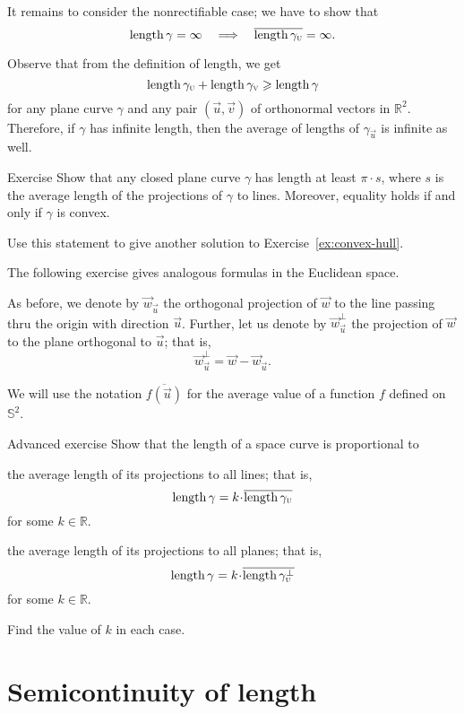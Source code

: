 It remains to consider the nonrectifiable case;
we have to show that 
\[\mathop{\rm length}\nolimits\gamma=\infty
\quad\Longrightarrow\quad
\overline{\mathop{\rm length}\nolimits\gamma_{\text{\sc{u}}}}=\infty.
\]

Observe that from the definition of length, we get
\[\mathop{\rm length}\nolimits\gamma_{\text{\sc{u}}}+\mathop{\rm length}\nolimits\gamma_{\text{\sc{v}}}\geqslant \mathop{\rm length}\nolimits\gamma\]
for any plane curve $\gamma$ and any pair $(\vec u , \vec v )$ of orthonormal vectors in $\mathbb{R}^2$.
Therefore, if $\gamma$ has infinite length, then the average of lengths of $\gamma_{\vec u}$ is infinite as well.
\qeds

\begin{thm}{Exercise}\label{ex:convex-croftons}
Show that any closed plane curve $\gamma$ has length at least $\pi\cdot s$, where $s$ is the average length of the projections of $\gamma$ to lines.
Moreover, equality holds if and only if $\gamma$ is convex.

Use this statement to give another solution to Exercise~\ref{ex:convex-hull}.
\end{thm}

The following exercise gives analogous formulas in the Euclidean space.

As before, we denote by $\vec w_{\vec u}$ the orthogonal projection of $\vec w$ to the line passing thru the origin with direction $\vec u$.
Further, let us denote by $\vec w_{\vec u}^\bot$ the projection of $\vec w$ to the plane orthogonal to $\vec u$;
that is,
\[\vec w_\vec u^\bot=\vec w - \vec w_{\vec u}.\]

We will use the notation 
$\overline{f(\vec u)}$ for the average value
of a function $f$ defined on $\mathbb{S}^2$.

\begin{thm}{Advanced exercise}\label{adex:more-croftons}
Show that the length of a space curve is proportional to 
\begin{subthm}{}
the average length of its projections to all lines; that is,
\[\length\gamma=k\cdot\overline{\length\gamma_{\vec u}}\]
for some $k \in \mathbb{R}$.
\end{subthm}
\begin{subthm}{}the average length of its projections to all planes; that is,
\[\length\gamma=k\cdot\overline{\length\gamma_{\vec u}^\bot}\]
for some $k \in \mathbb{R}$.
\end{subthm}
Find the value of $k$ in each case.
\end{thm}

\section{Semicontinuity of length}

